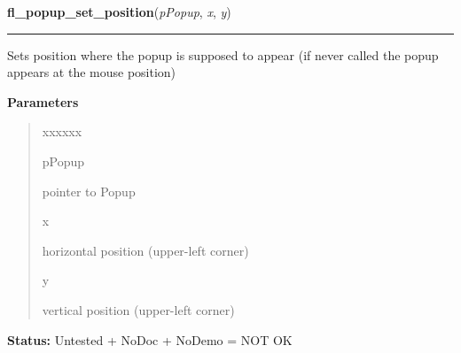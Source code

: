     \label{xformslib:library:fl_popup_set_position}

    \vspace{0.5ex}

\hspace{.8\funcindent}\begin{boxedminipage}{\funcwidth}

    \raggedright \textbf{fl\_popup\_set\_position}(\textit{pPopup}, \textit{x}, \textit{y})

    \vspace{-1.5ex}

    \rule{\textwidth}{0.5\fboxrule}
\setlength{\parskip}{2ex}
    Sets position where the popup is supposed to appear (if never called 
    the popup appears at the mouse position)

\setlength{\parskip}{1ex}
      \textbf{Parameters}
      \vspace{-1ex}

      \begin{quote}
        \begin{Ventry}{xxxxxx}

          \item[pPopup]

          pointer to Popup

          \item[x]

          horizontal position (upper-left corner)

          \item[y]

          vertical position (upper-left corner)

        \end{Ventry}

      \end{quote}

\textbf{Status:} Untested + NoDoc + NoDemo = NOT OK



    \end{boxedminipage}

    \label{xformslib:library:fl_popup_get_policy}

    \vspace{0.5ex}

